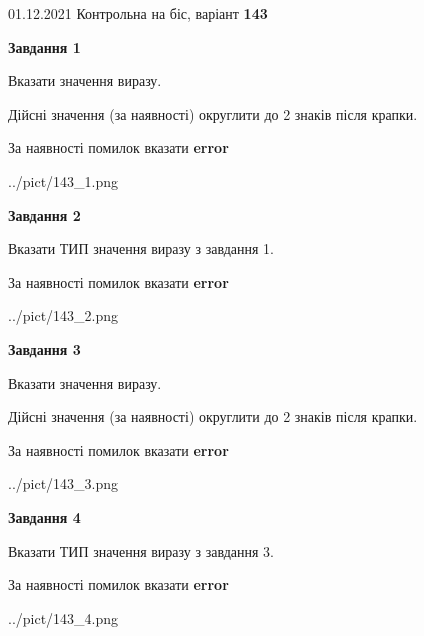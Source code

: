 \documentclass[11pt, ukrainian]{article}
\begin{document}
{01.12.2021 Контрольна на біс, варіант  \No \textbf { 143 }\par}
{
\begin {large}
{\begin {center}\textbf{Завдання 1}\end {center}}\par
Вказати значення виразу. \par
Дійсні значення (за наявності) округлити до 2 знаків після крапки. \par
За наявності помилок вказати \textbf{error}

\begin{center}
	{../pict/143_1.png}
\end{center}
\newpage

{\begin {center}\textbf{Завдання 2}\end {center}}\par
Вказати ТИП значення виразу з завдання 1. \par
За наявності помилок вказати \textbf{error}

\begin{center}
	{../pict/143_2.png}
\end{center}
\newpage

{\begin {center}\textbf{Завдання 3}\end {center}}\par
Вказати значення виразу. \par
Дійсні значення (за наявності) округлити до 2 знаків після крапки. \par
За наявності помилок вказати \textbf{error}

\begin{center}
	{../pict/143_3.png}
\end{center}
\newpage

{\begin {center}\textbf{Завдання 4}\end {center}}\par
Вказати ТИП значення виразу з завдання 3. \par
За наявності помилок вказати \textbf{error}

\begin{center}
	{../pict/143_4.png}
\end{center}
\newpage


\end{large}}
\end{document}
